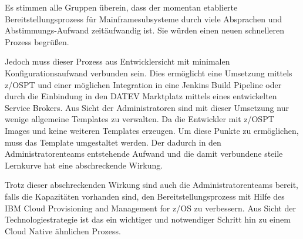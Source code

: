 Es stimmen alle Gruppen überein, dass der momentan etablierte Bereitstellungsprozess für Mainframesubsysteme durch viele Absprachen und Abstimmungs-Aufwand zeitäufwandig ist.
Sie würden einen neuen schnelleren Prozess begrüßen.

Jedoch muss dieser Prozess aus Entwicklersicht mit minimalen Konfigurationsaufwand verbunden sein.
Dies ermöglicht eine Umsetzung mittels z/OSPT und einer möglichen Integration in eine Jenkins Build Pipeline oder durch die Einbindung in den \glqq DATEV Marktplatz\grqq{} mittels eines entwickelten \glqq Service Brokers\grqq.
Aus Sicht der Administratoren sind mit dieser Umsetzung nur wenige allgemeine Templates zu verwalten.
Da die Entwickler mit z/OSPT Images und keine weiteren Templates erzeugen.
Um diese Punkte zu ermöglichen, muss das Template umgestaltet werden.
Der dadurch in den Administratorenteams entstehende Aufwand und die damit verbundene steile Lernkurve hat eine abschreckende Wirkung.

Trotz dieser abschreckenden Wirkung sind auch die Administratorenteams bereit, falls die Kapazitäten vorhanden sind, den Bereitstellungsprozess mit Hilfe des \glqq IBM Cloud Provisioning and Management for z/OS\grqq{} zu verbessern.
Aus Sicht der Technologiestrategie ist das ein wichtiger und notwendiger Schritt hin zu einem Cloud Native ähnlichen Prozess.
